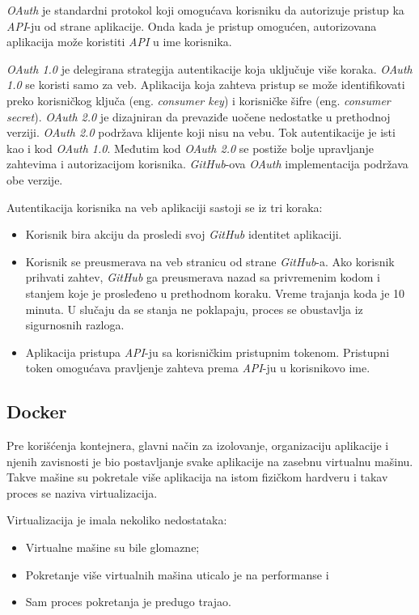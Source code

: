 \textit{OAuth} je standardni protokol koji omogućava korisniku da autorizuje pristup ka \textit{API}-ju 
od strane aplikacije. Onda kada je pristup omogućen, autorizovana aplikacija može koristiti 
\textit{API} u ime korisnika.

\textit{OAuth 1.0} je delegirana strategija autentikacije koja uključuje više koraka. 
\textit{OAuth 1.0} se koristi samo za veb. Aplikacija koja zahteva pristup se može identifikovati preko korisničkog 
ključa (eng. \textit{consumer key}) i korisničke šifre (eng. \textit{consumer secret}).
\textit{OAuth 2.0} je dizajniran da prevaziđe uočene nedostatke u prethodnoj verziji. 
\textit{OAuth 2.0} podržava klijente koji nisu na vebu. Tok autentikacije je isti kao i kod \textit{OAuth 1.0}. 
Međutim kod \textit{OAuth 2.0} se postiže bolje upravljanje zahtevima i autorizacijom korisnika.
\textit{GitHub}-ova \textit{OAuth} implementacija podržava obe verzije.

Autentikacija korisnika na veb aplikaciji sastoji se iz tri koraka:
\begin{itemize}
    \item Korisnik bira akciju da prosledi svoj \textit{GitHub} identitet aplikaciji.
    \item Korisnik se preusmerava na veb stranicu od strane \textit{GitHub}-a.
        Ako korisnik prihvati zahtev, \textit{GitHub} ga preusmerava nazad sa privremenim kodom i stanjem 
        koje je prosleđeno u prethodnom koraku. Vreme trajanja koda je 10 minuta. U slučaju da 
        se stanja ne poklapaju, proces se obustavlja iz sigurnosnih razloga.
    \item Aplikacija pristupa \textit{API}-ju sa korisničkim pristupnim tokenom. 
        Pristupni token omogućava pravljenje zahteva prema \textit{API}-ju u korisnikovo ime.
\end{itemize}

\subsection{Docker}\label{sec:docker}

Pre korišćenja kontejnera, glavni način za izolovanje, organizaciju aplikacije i njenih zavisnosti je 
bio postavljanje svake aplikacije na zasebnu virtualnu mašinu. Takve mašine su pokretale više aplikacija 
na istom fizičkom hardveru i takav proces se naziva virtualizacija.

Virtualizacija je imala nekoliko nedostataka: 
\begin{itemize}
    \item Virtualne mašine su bile glomazne;
    \item Pokretanje više virtualnih mašina uticalo je na performanse i
    \item Sam proces pokretanja je predugo trajao.
\end{itemize}

